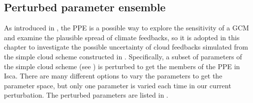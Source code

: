 
\subsection{Perturbed parameter ensemble}
\label{sec:PPE_setup}

As introduced in , the PPE is a possible way to explore the sensitivity of a GCM and examine the plausible spread of climate feedbacks, so it is adopted in this chapter to investigate the possible uncertainty of cloud feedbacks simulated from the simple cloud scheme constructed in . Specifically, a subset of parameters of the simple cloud scheme (see ) is perturbed to get the members of the PPE in Isca. There are many different options to vary the parameters to get the parameter space, but only one parameter is varied each time in our current perturbation. The perturbed parameters are listed in .

